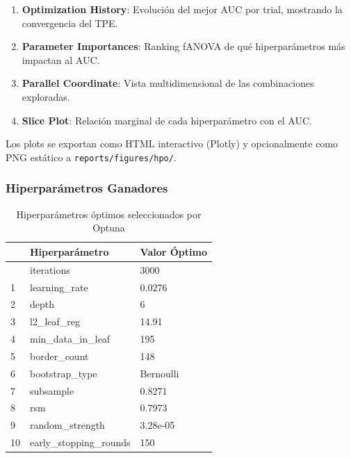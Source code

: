 \documentclass[
  spanish,
  11pt,
  letterpaper,
]{scrbook}
\providecommand{\tightlist}{%
  \setlength{\itemsep}{0pt}\setlength{\parskip}{0pt}}
\theoremstyle{plain}
\theoremstyle{remark}
\begin{document}
\begin{enumerate}
\def\labelenumi{\arabic{enumi}.}
\tightlist
\item
  \textbf{Optimization History}: Evolución del mejor AUC por trial,
  mostrando la convergencia del TPE.
\item
  \textbf{Parameter Importances}: Ranking fANOVA de qué hiperparámetros
  más impactan al AUC.
\item
  \textbf{Parallel Coordinate}: Vista multidimensional de las
  combinaciones exploradas.
\item
  \textbf{Slice Plot}: Relación marginal de cada hiperparámetro con el
  AUC.
\end{enumerate}

Los plots se exportan como HTML interactivo (Plotly) y opcionalmente
como PNG estático a \texttt{reports/figures/hpo/}.

\subsubsection{Hiperparámetros
Ganadores}\label{hiperparuxe1metros-ganadores}

{

\begin{longtable}[]{@{}lll@{}}

\caption{\label{tbl-best-params}Hiperparámetros óptimos seleccionados
por Optuna}

\tabularnewline

\toprule\noalign{}
& Hiperparámetro & Valor Óptimo \\
\midrule\noalign{}
\endhead
\bottomrule\noalign{}
\endlastfoot
0 & iterations & 3000 \\
1 & learning\_rate & 0.0276 \\
2 & depth & 6 \\
3 & l2\_leaf\_reg & 14.91 \\
4 & min\_data\_in\_leaf & 195 \\
5 & border\_count & 148 \\
6 & bootstrap\_type & Bernoulli \\
7 & subsample & 0.8271 \\
8 & rsm & 0.7973 \\
9 & random\_strength & 3.28e-05 \\
10 & early\_stopping\_rounds & 150 \\

\end{longtable}

}
\end{document}
